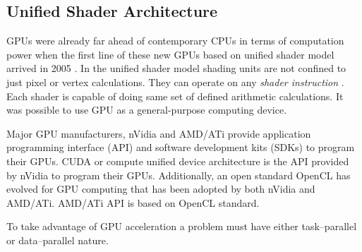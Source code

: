 \subsection{Unified Shader Architecture}
GPUs were already far ahead of contemporary CPUs in terms of computation power when the first line of these new GPUs based on unified shader model arrived in 2005 \cite{Ref:Unified-Shader-Architecture-devmaster.net}. In the unified shader model shading units are not confined to just pixel or vertex calculations. They can operate on any \emph{shader instruction} \cite{Ref:Unified-Shader-Model-wiki}. Each shader is capable of doing same set of defined arithmetic calculations. It was possible to use GPU as a general-purpose computing device.

Major GPU manufacturers, nVidia and AMD/ATi provide application programming interface (API) and software development kits (SDKs) to program their GPUs. CUDA or compute unified device architecture is the API provided by nVidia to program their GPUs. Additionally, an open standard OpenCL has evolved for GPU computing that has been adopted by both nVidia and AMD/ATi. AMD/ATi API is based on OpenCL standard.

To take advantage of GPU acceleration a problem must have either task--parallel or data--parallel nature.
